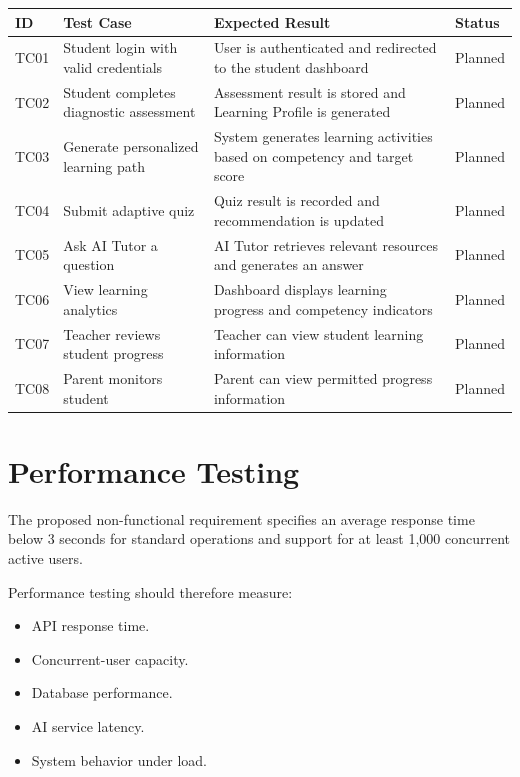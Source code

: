 \documentclass[12pt,a4paper]{report}
\begin{document}
\begin{longtable}{p{}p{}p{}p{}}
	\toprule
	\textbf{ID} & \textbf{Test Case} & \textbf{Expected Result} & \textbf{Status}\\
	\midrule
	
	TC01 & Student login with valid credentials
	& User is authenticated and redirected to the student dashboard
	& Planned\\
	
	TC02 & Student completes diagnostic assessment
	& Assessment result is stored and Learning Profile is generated
	& Planned\\
	
	TC03 & Generate personalized learning path
	& System generates learning activities based on competency and target score
	& Planned\\
	
	TC04 & Submit adaptive quiz
	& Quiz result is recorded and recommendation is updated
	& Planned\\
	
	TC05 & Ask AI Tutor a question
	& AI Tutor retrieves relevant resources and generates an answer
	& Planned\\
	
	TC06 & View learning analytics
	& Dashboard displays learning progress and competency indicators
	& Planned\\
	
	TC07 & Teacher reviews student progress
	& Teacher can view student learning information
	& Planned\\
	
	TC08 & Parent monitors student
	& Parent can view permitted progress information
	& Planned\\
	
	\bottomrule
\end{longtable}

\section{Performance Testing}

The proposed non-functional requirement specifies an average response time below 3 seconds for standard operations and support for at least 1,000 concurrent active users.

Performance testing should therefore measure:

\begin{itemize}
    \item API response time.
    \item Concurrent-user capacity.
    \item Database performance.
    \item AI service latency.
    \item System behavior under load.
\end{itemize}
\end{document}

